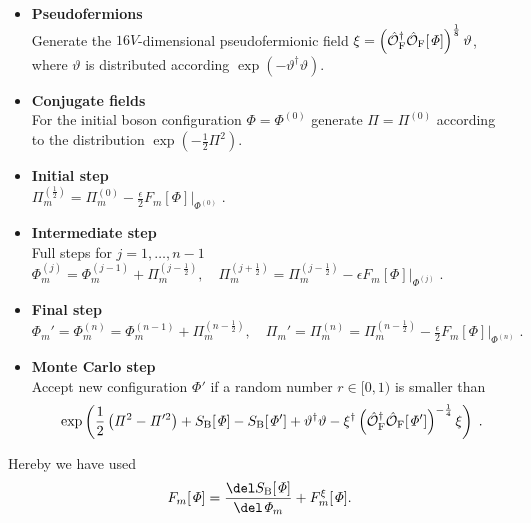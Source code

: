 \begin{itemize}
\item \textbf{Pseudofermions}\\
Generate the $16V$-dimensional pseudofermionic field $\xi = \left(\hat{\mathcal{O}}_{\rm F}^{\dagger}\hat{\mathcal{O}}_{\rm F}[\mathit{\Phi}] \right)^{\frac{1}{8}} \vartheta$, where $\vartheta$ is distributed according $\exp\left(-\vartheta^{\dagger}\vartheta\right)$.
%
%
\item \textbf{Conjugate fields}\\
For the initial boson configuration $\mathit{\Phi}=\mathit{\Phi}^{(0)}$ generate $\mathit{\Pi}=\mathit{\Pi}^{(0)}$ according to the  distribution $\exp \left(-\frac{1}{2}\mathit{\Pi}^{2}\right)$.
%
%
\item \textbf{Initial step}\\
$\mathit{\Pi}_{m}^{(\frac{1}{2})} = \mathit{\Pi}_{m}^{(0)} - \frac{\epsilon}{2} F_{m}[\mathit{\Phi}]\Big\vert_{\mathit{\Phi}^{(0)}}  \;.$
%
%
\item \textbf{Intermediate step}\\
Full steps for $j=1,\ldots,n-1$ \\[0.2cm]
$\mathit{\Phi}_{m}^{(j)} = \mathit{\Phi}_{m}^{(j-1)} + \mathit{\Pi}_{m}^{(j-\frac{1}{2})}, \quad  \mathit{\Pi}_{m}^{(j+\frac{1}{2})} = \mathit{\Pi}_{m}^{(j-\frac{1}{2})} - \epsilon F_{m}[\mathit{\Phi}]\Big\vert_{\mathit{\Phi}^{(j)}}\;.$
%
%
\item \textbf{Final step}\\
$\mathit{\Phi}_{m}' = \mathit{\Phi}_{m}^{(n)} = \mathit{\Phi}_{m}^{(n-1)} + \mathit{\Pi}_{m}^{(n-\frac{1}{2})}, \quad \mathit{\Pi}_{m}' = \mathit{\Pi}_{m}^{(n)} = \mathit{\Pi}_{m}^{(n-\frac{1}{2})} - \frac{\epsilon}{2} F_{m}[\mathit{\Phi}]\Big\vert_{\mathit{\Phi}^{(n)}}\;.$
%
%
\item \textbf{Monte Carlo step}\\
Accept new configuration $\mathit{\Phi}'$ if a random number $r \in [0,1)$ is smaller than
\[\exp\left(\frac{1}{2}\left(\mathit{\Pi}^{2}-\mathit{\Pi}'^{2}\right) + S_{\rm B}[\mathit{\Phi}]- S_{\rm B}[\mathit{\Phi}'] +\vartheta^{\dagger}\vartheta - \xi^{\dagger} \left(\hat{\mathcal{O}}_{\rm F}^{\dagger}\hat{\mathcal{O}}_{\rm F}[\mathit{\Phi}']\right)^{-\frac{1}{4}} \xi \right) \;.  \]
\end{itemize}
%
%
Hereby we have used 
%
%
\begin{equation}
F_{m}[\mathit{\Phi}] = \frac{\del S_{\rm B}[\mathit{\Phi}]}{\del \mathit{\Phi}_{m}} + F_{m}^{\xi}[\mathit{\Phi}].
\end{equation}